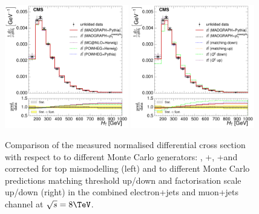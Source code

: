 \begin{figure}[hbtp]
    \centering
     \includegraphics[width=0.48\textwidth]{Chapters/04_Analysis/04b_XSections/images/results/8TeV/HT/central/normalised_xsection_combined_different_generators.pdf}\hfill
     \includegraphics[width=0.48\textwidth]{Chapters/04_Analysis/04b_XSections/images/results/8TeV/HT/central/normalised_xsection_combined_systematics_shifts.pdf}\hfill
     \caption{Comparison of the measured normalised differential cross section with respect to \HT to
     different Monte Carlo generators: \MADGRAPH, \POWHEG+\HERWIG, \POWHEG+\PYTHIA and \MADGRAPH corrected for
     top \pt mismodelling (left) and to different Monte Carlo predictions matching threshold up/down and
     factorisation scale up/down (right) in the combined electron+jets and muon+jets channel at
     $\sqrt{s}=8\TeV$.}
     \label{fig:result_HT_8TeV_combined}
\end{figure}

